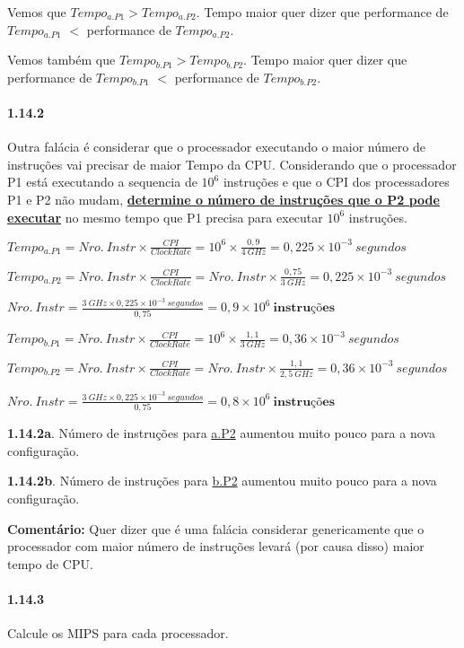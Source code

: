 \documentclass{article}
\begin{document}
Vemos que $Tempo_{a.P1} > Tempo_{a.P2}$. Tempo maior quer dizer que performance 
de $Tempo_{a.P1}$ $<$ performance de $Tempo_{a.P2}$.

Vemos também que $Tempo_{b.P1} > Tempo_{b.P2}$. Tempo maior quer dizer que 
performance de $Tempo_{b.P1}$ $<$ performance de $Tempo_{b.P2}$.

\paragraph{1.14.2} Outra falácia é considerar que o processador executando o
maior número de instruções vai precisar de maior Tempo da CPU. Considerando que
o processador P1 está executando a sequencia de $10^{6}$ instruções e que o CPI
dos processadores P1 e P2 não mudam, \underline{\bfseries determine o número 
de instruções que o P2 pode executar} no mesmo tempo que P1 precisa para 
executar $10^{6}$ instruções.

$Tempo_{a.P1} = Nro.\ Instr \times \frac{CPI}{Clock Rate} = 10^{6}
\times \frac{0,9}{4\ GHz} = 0,225 \times 10^{-3}\ segundos$

$Tempo_{a.P2} = Nro.\ Instr \times \frac{CPI}{Clock Rate} =  Nro.\ Instr
\times \frac{0,75}{3\ GHz} = 0,225 \times 10^{-3}\ segundos$

$Nro.\ Instr = \frac{3\ GHz \times 0,225 \times 10^{-3}\ segundos}{0,75} = 
0,9 \times 10^{6}\ \textbf{instruções}$

\pagebreak
$Tempo_{b.P1} = Nro.\ Instr \times \frac{CPI}{Clock Rate} = 10^{6}
\times \frac{1,1}{3\ GHz} = 0,36 \times 10^{-3}\ segundos$

$Tempo_{b.P2} = Nro.\ Instr \times \frac{CPI}{Clock Rate} =  Nro.\ Instr
\times \frac{1,1}{2,5\ GHz} = 0,36 \times 10^{-3}\ segundos$

$Nro.\ Instr = \frac{3\ GHz \times 0,225 \times 10^{-3}\ segundos}{0,75} = 
0,8 \times 10^{6}\ \textbf{instruções}$

\textbf{1.14.2a}. Número de instruções para \underline{a.P2} aumentou muito 
pouco para a nova configuração.

\textbf{1.14.2b}. Número de instruções para \underline{b.P2} aumentou muito 
pouco para a nova configuração.

\textbf{Comentário:} Quer dizer que é uma falácia considerar genericamente que o
processador com maior número de instruções levará (por causa disso) maior tempo
de CPU.

\paragraph{1.14.3} Calcule os MIPS para cada processador.
\end{document}
